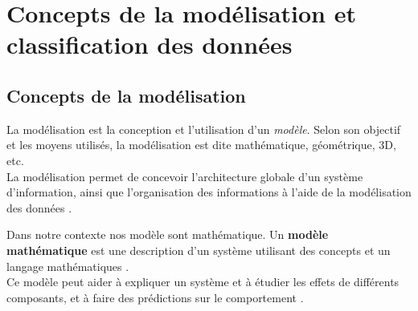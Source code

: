 	
	
	
	
	
	\section{Concepts de la modélisation et classification des données}
	
	\subsection{{Concepts de la modélisation}}\label{subsec:modelisation}
	La modélisation est la conception et l'utilisation d'un \textit{modèle}. Selon son objectif et les moyens utilisés, la modélisation est dite mathématique, géométrique, 3D, etc. \\
	La modélisation permet de concevoir l'architecture globale d'un système d'information, ainsi que l'organisation des informations à l'aide de la modélisation des données \cite{matloff2017statistical}.
	
	Dans notre contexte nos modèle sont mathématique. Un \textbf{modèle mathématique} est une description d'un système utilisant des concepts et un langage mathématiques \cite{darlington2016regression}.\\
	Ce modèle peut aider à expliquer un système et à étudier les effets de différents composants, et à faire des prédictions sur le comportement \cite{harrell2001regression}.
	
	
